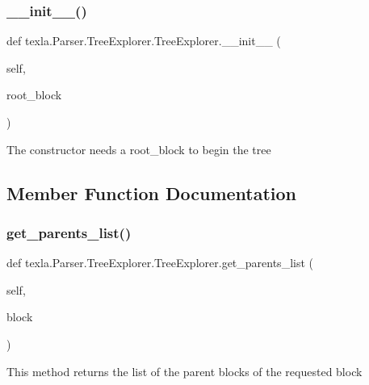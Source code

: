 \subsubsection{\texorpdfstring{\+\_\+\+\_\+init\+\_\+\+\_\+()}{\_\_init\_\_()}}
{\footnotesize\ttfamily def texla.\+Parser.\+Tree\+Explorer.\+Tree\+Explorer.\+\_\+\+\_\+init\+\_\+\+\_\+ (\begin{DoxyParamCaption}\item[{}]{self,  }\item[{}]{root\+\_\+block }\end{DoxyParamCaption})}

\begin{DoxyVerb}The constructor needs a root_block to
begin the tree\end{DoxyVerb}
 

\subsection{Member Function Documentation}
\hypertarget{classtexla_1_1Parser_1_1TreeExplorer_1_1TreeExplorer_ad948e5828a35215fa58ec9ba7e194e7e}{}\label{classtexla_1_1Parser_1_1TreeExplorer_1_1TreeExplorer_ad948e5828a35215fa58ec9ba7e194e7e} 
\subsubsection{\texorpdfstring{get\+\_\+parents\+\_\+list()}{get\_parents\_list()}}
{\footnotesize\ttfamily def texla.\+Parser.\+Tree\+Explorer.\+Tree\+Explorer.\+get\+\_\+parents\+\_\+list (\begin{DoxyParamCaption}\item[{}]{self,  }\item[{}]{block }\end{DoxyParamCaption})}

\begin{DoxyVerb}This method returns the list of the parent
blocks of the requested block\end{DoxyVerb}
 \hypertarget{classtexla_1_1Parser_1_1TreeExplorer_1_1TreeExplorer_a3fb88b30a1ed2a58cbb3e4c1099c7ddd}{}\label{classtexla_1_1Parser_1_1TreeExplorer_1_1TreeExplorer_a3fb88b30a1ed2a58cbb3e4c1099c7ddd} 
